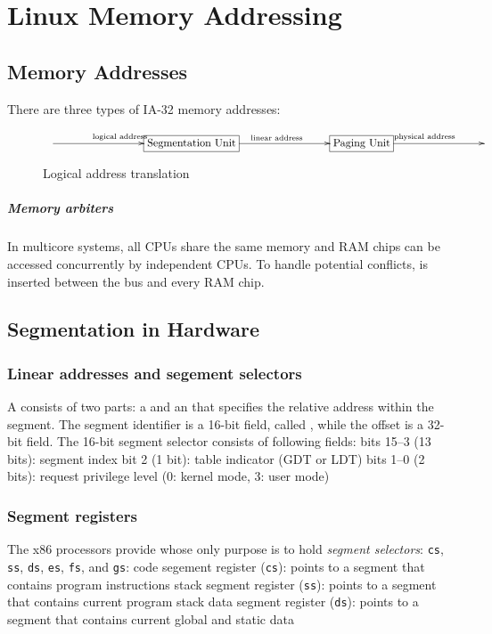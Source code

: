 \chapter{Linux Memory Addressing}


\section{Memory Addresses}
There are three types of IA-32 memory addresses:
\bit
\w {}
\w {}
\w {}
\eit

\begin{figure}[ht]
\[\xymatrix{
  \mbox{ } \ar[rrr]^{\mbox{\scriptsize{}logical address}} &&& *+[F]{\mbox{Segmentation Unit}}
  \ar[rrr]^{\mbox{\scriptsize{}linear address}}  &&& *+[F]{\mbox{Paging Unit}}
  \ar[rrr]^{\mbox{\scriptsize{}physical address}} &&&
}
\]
\caption{Logical address translation}
\end{figure}


\paragraph{Memory arbiters}
In multicore systems, all CPUs share the same memory and RAM chips can be
accessed concurrently by independent CPUs. To handle potential conflicts,
 is inserted between the bus and every RAM chip.



\section{Segmentation in Hardware}
\subsection{Linear addresses and segement selectors}
A  consists of two parts: a  and an
 that specifies the relative address within the segment. 
The segment identifier is a 16-bit field, called , while
the offset is a 32-bit field.
The 16-bit segment selector consists of following fields:
\bit
\w bits 15--3 (13 bits): segment index
\w bit 2 (1 bit): table indicator (GDT or LDT)
\w bits 1--0 (2 bits): request privilege level (0: kernel mode, 3: user mode)
\eit


\subsection{Segment registers}
The x86 processors provide  whose only purpose is to
hold {\em segment selectors}: {\tt{}cs}, {\tt{}ss}, {\tt{}ds}, {\tt{}es},
{\tt{}fs}, and {\tt{}gs}:
\bit
\w code segement register ({\tt{}cs}): points to a segment that contains
program instructions
\w stack segment register ({\tt{}ss}): points to a segment that contains
current program stack
\w data segment register ({\tt{}ds}): points to a segment that contains
current global and static data
\eit

